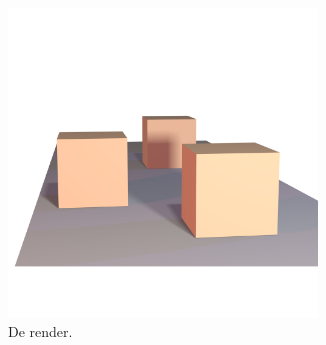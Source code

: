 \begin{figure}
  \centering
  \begin{subfigure}[b]{0.5\textwidth}
    \centering
    \includegraphics[width=0.9\textwidth]{./img/raw/vp-perspectief/render.png}
    \caption{De render.}
    \label{fig:vp-perspectief:render}
  \end{subfigure}%
  \begin{subfigure}[b]{0.5\textwidth}
    \centering
\end{subfigure}
\end{figure}
